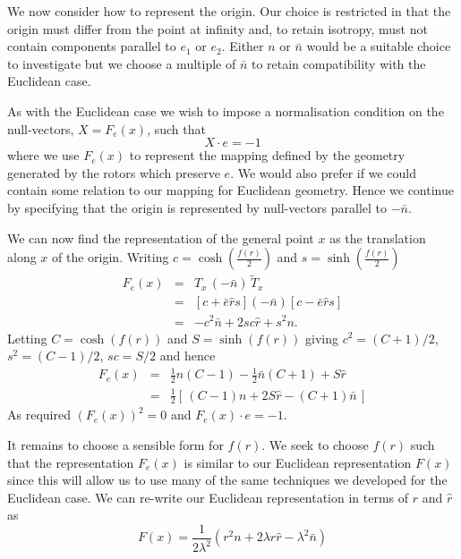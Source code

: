 We now consider how to represent the origin. Our choice is restricted in 
that the origin must differ from the 
point at infinity and, to retain isotropy, must not contain components
parallel to $e_1$ or $e_2$.  Either $n$ or $\bar{n}$ would be a suitable
choice to investigate but we choose a multiple of $\bar{n}$ to retain
compatibility with the Euclidean case.

As with the Euclidean case we wish to impose a normalisation condition 
on the null-vectors, 
$X = F_e(x)$, such that 
\begin{equation}
X \cdot e = -1
\end{equation}
where we use $F_e(x)$ to represent the mapping defined by the geometry
generated by the rotors which
preserve $e$. We would also prefer if we could contain some 
relation to our mapping for Euclidean geometry. Hence we continue by
specifying that the origin is represented by null-vectors parallel to $-\bar{n}$.

We can now find the representation of the general point $x$ as the translation
along $x$ of the origin. Writing $c = \cosh\left(\frac{f(r)}{2}\right)$ and
$s = \sinh\left(\frac{f(r)}{2}\right)$
\begin{eqnarray}
F_e(x) & = & T_x\,(-\bar{n})\,\tilde{T}_x \\
& = & \left[c + \bar{e}\hat{r}s\right] (-\bar{n}) \left[c - \bar{e}\hat{r}s\right] \\
&=& -c^2\bar{n} + 2sc\hat{r} + s^2n.
\end{eqnarray}
Letting $C = \cosh(f(r))$ and $S = \sinh(f(r))$ giving $c^2 = (C+1) / 2$,
$s^2 = (C-1)/2$, $sc = S/2$ and hence
\begin{eqnarray}
F_e(x) & = & \frac{1}{2}n (C-1) - \frac{1}{2}\bar{n}(C+1) + S\hat{r} \nonumber \\
& = & \frac{1}{2} \left[ \, (C-1)n + 2S\hat{r} - (C+1)\bar{n} \, \right] 
\label{eqn:almost-X-rep} 
\end{eqnarray}
As required $(F_e(x))^2 = 0$ and $F_e(x) \cdot e = -1$.

It remains to choose a sensible form for $f(r)$. We seek to choose $f(r)$ such that
the representation $F_e(x)$ is similar to our Euclidean representation $F(x)$
since this will allow us to use many of the same techniques we developed for the
Euclidean case. We can re-write our Euclidean representation 
in terms of $r$ and $\hat{r}$ as
\begin{equation}
F(x) = \frac{1}{2\lambda^2}(r^2n + 2 \lambda r\hat{r} - \lambda^2\bar{n})
\label{eqn:nonEuclidMap1}
\end{equation}

